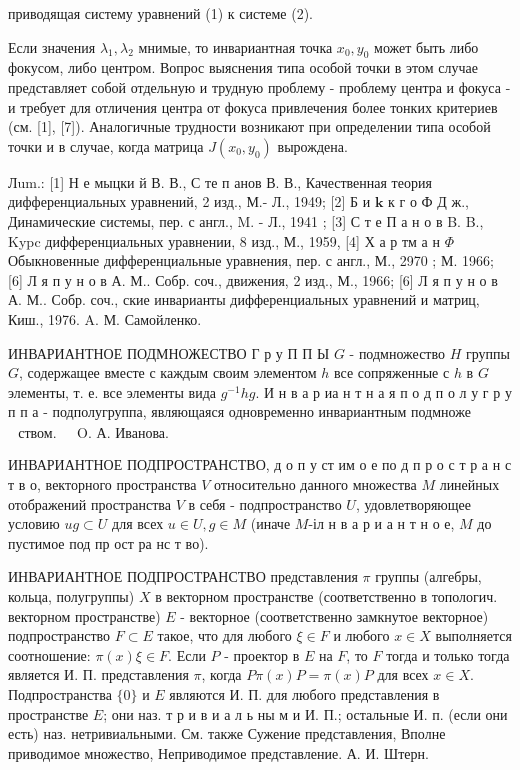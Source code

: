 \documentclass[10pt]{article}
\begin{document}
приводящая систему уравнений (1) к системе (2).



Если значения $\lambda_{1}, \lambda_{2}$ мнимые, то инвариантная точка $x_{0}, y_{0}$ может быть либо фокусом, либо центром. Вопрос выяснения типа особой точки в этом случае представляет собой отдельную и трудную проблему - проблему центра и фокуса - и требует для отличения центра от фокуса привлечения более тонких критериев (см. [1], [7]). Аналогичные трудности возникают при определении типа особой точки и в случае, когда матрица $J\left(x_{0}, y_{0}\right)$ вырождена.



Лum.: [1] Н е мыцки й В. В., С те п анов В. В., Качественная теория дифференциальных уравнений, 2 изд., М.- Л., 1949; [2] Б и $\mathbf{k}$ к г о Ф Д ж., Динамические системы, пер. с англ., M. - Л., 1941 ; [3] С т е П а н о в B. B., Kypc дифференциальных уравнении, 8 изд., М., 1959, [4] Х а р тм а н $\Phi$ Обыкновенные дифференциальные уравнения, пер. с англ., М., 2970 ; М. 1966; [6] Л я п у н о в А. М.. Собр. соч., движения, 2 изд., М., 1966; [6] Л я п у н о в А. М.. Собр. соч., ские инварианты дифференциальных уравнений и матриц, Киш., 1976. A. М. Самойленко.



ИНВАРИАНТНОЕ ПОДМНОЖЕСТВО Г р у П П Ы $G$ - подмножество $H$ группы $G$, содержащее вместе с каждым своим элементом $h$ все сопряженные с $h$ в $G$ элементы, т. е. все элементы вида $g^{-1} h g$. И н в а р иа н т н а я п о д п о л у г р у п п а - подполугруппа, являющаяся одновременно инвариантным подмноже$\begin{array}{ll}\text { ством. } & \text { O. А. Иванова. }\end{array}$



ИНВАРИАНТНОЕ ПОДПРОСТРАНСТВО, д о п у ст им о е по д п р о с т р а н с т в о, векторного пространства $V$ относительно данного множества $M$ линейных отображений пространства $V$ в себя - подпространство $U$, удовлетворяющее условию $u g \subset U$ для всех $u \in U, g \in M$ (иначе $M$-іл н в а р и а н т н о е, $M$ до пустимое под пр ост ра нс т во).



ИНВАРИАНТНОЕ ПОДПРОСТРАНСТВО представления $\pi$ группы (алгебры, кольца, полугруппы) $X$ в векторном пространстве (соответственно в топологич. векторном пространстве) $E$ - векторное (соответственно замкнутое векторное) подпространство $F \subset E$ такое, что для любого $\xi \in F$ и любого $x \in X$ выполняется соотношение: $\pi(x) \xi \in F$. Если $P$ - проектор в $E$ на $F$, то $F$ тогда и только тогда является И. П. представления $\pi$, когда $P \pi(x) P=\pi(x) P$ для всех $x \in X$. Подпространства $\{0\}$ и $E$ являются И. П. для любого представления в пространстве $E$; они наз. т р и в и а л ь ны м и И. П.; остальные И. п. (если они есть) наз. нетривиальными. См. также Сужение представления, Вполне приводимое множество, Неприводимое представление. А. И. Штерн.
\end{document}
